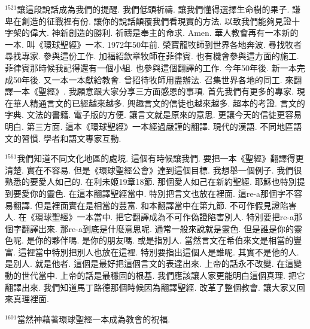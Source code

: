 \documentclass{book}
\begin{document}
$^{1521}$讓這段說話成為我們的提醒.
我們低頭祈禱.
讓我們懂得選擇生命樹的果子.
謙卑在創造的征戰裡有份.
讓你的說話顛覆我們看現實的方法.
以致我們能夠見證十字架的偉大.
神新創造的勝利.
祈禱是奉主的命求.
Amen.
華人教會再有一本新的一本.
叫《環球聖經》一本.
1972年50年前.
榮寶龍牧師到世界各地奔波.
尋找牧者尋找專家.
參與這份工作.
加福紹欽章牧師在菲律賓.
也有機會參與這方面的施工.
菲律賓那時候我記得還有一個小組.
也參與這個翻譯的工作.
今年50年後.
新一本完成50年後.
又一本一本獻給教會.
曾招待牧師用盡辦法.
召集世界各地的同工.
來翻譯一本《聖經》.
我願意跟大家分享三方面感恩的事項.
首先我們有更多的專家.
現在華人精通言文的已經越來越多.
興趣言文的信徒也越來越多.
超本的考證.
言文的字典.
文法的書籍.
電子版的方便.
讓言文就是原來的意思.
更讓今天的信徒更容易明白.
第三方面.
這本《環球聖經》一本經過嚴謹的翻譯.
現代的漢語.
不同地區語文的習慣.
學者和語文專家互動.

$^{1561}$我們知道不同文化地區的處境.
這個有時候讓我們.
要把一本《聖經》翻譯得更清楚.
實在不容易.
但是《環球聖經公會》達到這個目標.
我想舉一個例子.
我們很熟悉的要愛人如己的.
在利未姬19章18節.
那個愛人如己在新約聖經.
耶穌也特別提到要愛你的靈色.
在這本翻譯聖經當中.
特別把言文也放在裡面.
這re-a那個字不容易翻譯.
但是裡面實在是相當的豐富.
和本翻譯當中在第九節.
不可作假見證陷害人.
在《環球聖經》一本當中.
把它翻譯成為不可作偽證陷害別人.
特別要把re-a那個字翻譯出來.
那re-a到底是什麼意思呢.
通常一般來說就是靈色.
但是誰是你的靈色呢.
是你的夥伴嗎.
是你的朋友嗎.
或是指別人.
當然言文在希伯來文是相當的豐富.
這裡當中特別把別人也放在這裡.
特別要指出這個人是誰呢.
其實不是他的人.
是別人.
就是他者.
這個是最好把這個言文的表達出來.
上帝的話永不改變.
在這變動的世代當中.
上帝的話是最穩固的根基.
我們應該讓人家更能明白這個真理.
把它翻譯出來.
我們知道馬丁路德那個時候因為翻譯聖經.
改革了整個教會.
讓大家又回來真理裡面.

$^{1601}$當然神藉著環球聖經一本成為教會的祝福.
\newpage
\end{document}
